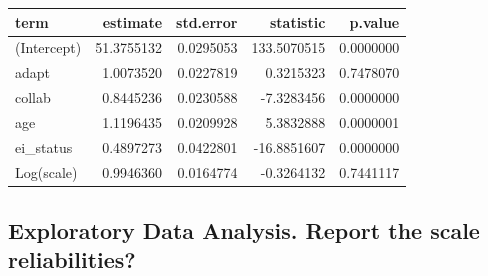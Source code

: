\documentclass[
  letterpaper,
  DIV=11,
  numbers=noendperiod]{scrreprt}
\newenvironment{Shaded}{\begin{snugshade}}{\end{snugshade}}
\newcommand{\AttributeTok}[1]{\textcolor[rgb]{0.40,0.45,0.13}{#1}}
\newcommand{\FunctionTok}[1]{\textcolor[rgb]{0.28,0.35,0.67}{#1}}
\newcommand{\NormalTok}[1]{\textcolor[rgb]{0.00,0.23,0.31}{#1}}
\newcommand{\OtherTok}[1]{\textcolor[rgb]{0.00,0.23,0.31}{#1}}
\newcommand{\SpecialCharTok}[1]{\textcolor[rgb]{0.37,0.37,0.37}{#1}}
\newcommand{\StringTok}[1]{\textcolor[rgb]{0.13,0.47,0.30}{#1}}
\begin{document}
\begin{Shaded}
\end{Shaded}

\begin{longtable}[]{@{}lrrrr@{}}
\toprule()
term & estimate & std.error & statistic & p.value \\
\midrule()
\endhead
(Intercept) & 51.3755132 & 0.0295053 & 133.5070515 & 0.0000000 \\
adapt & 1.0073520 & 0.0227819 & 0.3215323 & 0.7478070 \\
collab & 0.8445236 & 0.0230588 & -7.3283456 & 0.0000000 \\
age & 1.1196435 & 0.0209928 & 5.3832888 & 0.0000001 \\
ei\_status & 0.4897273 & 0.0422801 & -16.8851607 & 0.0000000 \\
Log(scale) & 0.9946360 & 0.0164774 & -0.3264132 & 0.7441117 \\
\bottomrule()
\end{longtable}

\hypertarget{exploratory-data-analysis.-report-the-scale-reliabilities}{%
\subsection{Exploratory Data Analysis. Report the scale
reliabilities?}\label{exploratory-data-analysis.-report-the-scale-reliabilities}}
\end{document}
